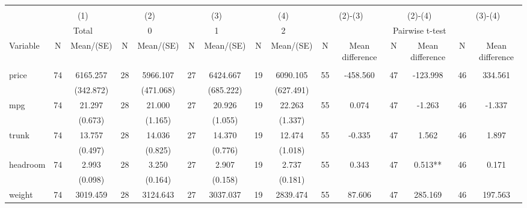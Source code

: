 
\begin{tabular}{@{\extracolsep{5pt}}lcccccccccccccc}
\\[-1.8ex]\hline \hline \\[-1.8ex]
 & \multicolumn{2}{c}{(1)}  & \multicolumn{2}{c}{(2)}  & \multicolumn{2}{c}{(3)}  & \multicolumn{2}{c}{(4)}  & \multicolumn{2}{c}{(2)-(3)} & \multicolumn{2}{c}{(2)-(4)} & \multicolumn{2}{c}{(3)-(4)} \\
 & \multicolumn{2}{c}{Total}  & \multicolumn{2}{c}{0}  & \multicolumn{2}{c}{1}  & \multicolumn{2}{c}{2}  & \multicolumn{6}{c}{Pairwise t-test}  \\
Variable & N & Mean/(SE) & N & Mean/(SE) & N & Mean/(SE) & N & Mean/(SE) & N & Mean difference & N & Mean difference & N & Mean difference \\ \hline \\[-1.8ex] 
price   & 74    & 6165.257    & 28    & 5966.107    & 27    & 6424.667    & 19    & 6090.105    & 55    & -458.560    & 47    & -123.998    & 46    & 334.561   \\
 &   & (342.872)  &   & (471.068)  &   & (685.222)  &   & (627.491)  &   &  &   &  &   &  \\ [1ex]
mpg   & 74    & 21.297    & 28    & 21.000    & 27    & 20.926    & 19    & 22.263    & 55    & 0.074    & 47    & -1.263    & 46    & -1.337   \\
 &   & (0.673)  &   & (1.165)  &   & (1.055)  &   & (1.337)  &   &  &   &  &   &  \\ [1ex]
trunk   & 74    & 13.757    & 28    & 14.036    & 27    & 14.370    & 19    & 12.474    & 55    & -0.335    & 47    & 1.562    & 46    & 1.897   \\
 &   & (0.497)  &   & (0.825)  &   & (0.776)  &   & (1.018)  &   &  &   &  &   &  \\ [1ex]
headroom   & 74    & 2.993    & 28    & 3.250    & 27    & 2.907    & 19    & 2.737    & 55    & 0.343    & 47    & 0.513**    & 46    & 0.171   \\
 &   & (0.098)  &   & (0.164)  &   & (0.158)  &   & (0.181)  &   &  &   &  &   &  \\ [1ex]
weight   & 74    & 3019.459    & 28    & 3124.643    & 27    & 3037.037    & 19    & 2839.474    & 55    & 87.606    & 47    & 285.169    & 46    & 197.563   \\

\end{tabular}
